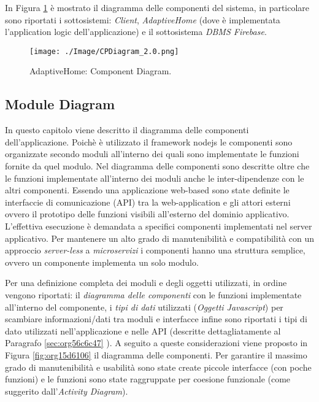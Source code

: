 \documentclass[onecolumn,a4paper]{article}
\begin{document}
In Figura \ref{fig:org2ef9e4a} è mostrato il diagramma delle componenti del sistema, in particolare sono riportati i sottosistemi: \emph{Client}, \emph{AdaptiveHome} (dove è implementata l'application logic dell'applicazione) e il sottosistema \emph{DBMS Firebase}.

\begin{figure}[htbp]
\centering
\texttt{[image: ./Image/CPDiagram\_2.0.png]}
\caption{\label{fig:org2ef9e4a}AdaptiveHome: Component Diagram.}
\end{figure}

\subsection{Module Diagram}
\label{sec:org544702e}
In questo capitolo viene descritto il diagramma delle componenti dell'applicazione. Poichè è utilizzato il framework nodejs le componenti sono organizzate secondo moduli all'interno dei quali sono implementate le funzioni fornite da quel modulo. Nel diagramma delle componenti sono descritte oltre che le funzioni implementate all'interno dei moduli anche le inter-dipendenze con le altri componenti. Essendo una applicazione web-based sono state definite le interfaccie di comunicazione (API) tra la web-application e gli attori esterni ovvero il prototipo delle funzioni visibili all'esterno del dominio applicativo. L'effettiva esecuzione è demandata a specifici componenti implementati nel server applicativo. Per mantenere un alto grado di manutenibilità e compatibilità con un approccio \emph{server-less} a \emph{microservizi} i componenti hanno una struttura semplice, ovvero un componente implementa un solo modulo.

Per una definizione completa dei moduli e degli oggetti utilizzati, in ordine vengono riportati: il \emph{diagramma delle componenti} con le funzioni implementate all'interno del componente, i \emph{tipi di dati} utilizzati (\emph{Oggetti Javascript}) per scambiare informazioni/dati tra moduli e interfacce infine sono riportati i tipi di dato utilizzati nell'applicazione e nelle API (descritte dettagliatamente al Paragrafo \ref{sec:org56c6c47} ). A seguito a queste considerazioni viene proposto in Figura \ref{fig:org15d6106} il diagramma delle componenti. Per garantire il massimo grado di manutenibilità e usabilità sono state create piccole interfacce (con poche funzioni) e le funzioni sono state raggruppate per coesione funzionale (come suggerito dall'\emph{Activity Diagram}).
\end{document}
